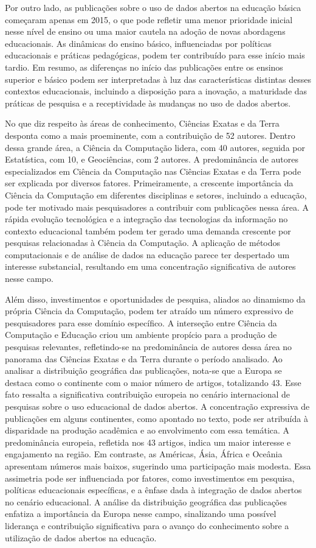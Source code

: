 \documentclass[portuguese]{textolivre}
\begin{document}
Por outro lado, as publicações sobre o uso de dados abertos na educação básica começaram apenas em 2015, o que pode refletir uma menor prioridade inicial nesse nível de ensino ou uma maior cautela na adoção de novas abordagens educacionais. As dinâmicas do ensino básico, influenciadas por políticas educacionais e práticas pedagógicas, podem ter contribuído para esse início mais tardio. Em resumo, as diferenças no início das publicações entre os ensinos superior e básico podem ser interpretadas à luz das características distintas desses contextos educacionais, incluindo a disposição para a inovação, a maturidade das práticas de pesquisa e a receptividade às mudanças no uso de dados abertos.

No que diz respeito às áreas de conhecimento, Ciências Exatas e da Terra desponta como a mais proeminente, com a contribuição de 52 autores. Dentro dessa grande área, a Ciência da Computação lidera, com 40 autores, seguida por Estatística, com 10, e Geociências, com 2 autores. A predominância de autores especializados em Ciência da Computação nas Ciências Exatas e da Terra pode ser explicada por diversos fatores. Primeiramente, a crescente importância da Ciência da Computação em diferentes disciplinas e setores, incluindo a educação, pode ter motivado mais pesquisadores a contribuir com publicações nessa área. A rápida evolução tecnológica e a integração das tecnologias da informação no contexto educacional também podem ter gerado uma demanda crescente por pesquisas relacionadas à Ciência da Computação. A aplicação de métodos computacionais e de análise de dados na educação parece ter despertado um interesse substancial, resultando em uma concentração significativa de autores nesse campo. 

Além disso, investimentos e oportunidades de pesquisa, aliados ao dinamismo da própria Ciência da Computação, podem ter atraído um número expressivo de pesquisadores para esse domínio específico. A interseção entre Ciência da Computação e Educação criou um ambiente propício para a produção de pesquisas relevantes, refletindo-se na predominância de autores dessa área no panorama das Ciências Exatas e da Terra durante o período analisado.
Ao analisar a distribuição geográfica das publicações, nota-se que a Europa se destaca como o continente com o maior número de artigos, totalizando 43. Esse fato ressalta a significativa contribuição europeia no cenário internacional de pesquisas sobre o uso educacional de dados abertos.
A concentração expressiva de publicações em alguns continentes, como apontado no texto, pode ser atribuída à disparidade na produção acadêmica e ao envolvimento com essa temática. A predominância europeia, refletida nos 43 artigos, indica um maior interesse e engajamento na região. Em contraste, as Américas, Ásia, África e Oceânia apresentam números mais baixos, sugerindo uma participação mais modesta. Essa assimetria pode ser influenciada por fatores, como investimentos em pesquisa, políticas educacionais específicas, e a ênfase dada à integração de dados abertos no cenário educacional. A análise da distribuição geográfica das publicações enfatiza a importância da Europa nesse campo, sinalizando uma possível liderança e contribuição significativa para o avanço do conhecimento sobre a utilização de dados abertos na educação. 
\end{document}
